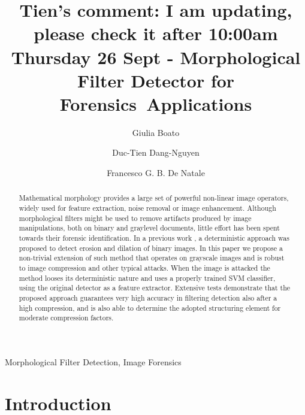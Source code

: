 \documentclass[review]{elsarticle}
\begin{document}
\begin{frontmatter}

\title{Tien's comment: I am updating, please check it after 10:00am Thursday 26 Sept - Morphological Filter Detector for Forensics~Applications}

\author{Giulia Boato}
\address{University of Trento, Italy}


\author{Duc-Tien Dang-Nguyen}
\address{University of Bergen, Norway}

\author{Francesco G. B. De Natale}
\address{University of Trento, Italy}

\begin{abstract}
Mathematical morphology provides a large set of powerful non-linear image operators, widely used for feature extraction, noise removal or image enhancement. Although morphological filters might be used to remove artifacts produced by image manipulations, both on binary and graylevel documents, little effort has been spent towards their forensic identification. In a previous work \cite{de2017detecting}, a deterministic approach was proposed to detect erosion and dilation of binary images. In this paper we propose a non-trivial extension of such method that operates on grayscale images and is robust to image compression and other typical attacks. When the image is attacked the method looses its deterministic nature and uses a properly trained SVM classifier, using the original detector as a feature extractor. Extensive tests demonstrate that the proposed approach guarantees very high accuracy in filtering detection also after a high compression, and is also able to determine the adopted structuring element for moderate compression factors.
\end{abstract}

\begin{keyword}
Morphological Filter Detection, Image Forensics 
\end{keyword}

\end{frontmatter}

\linenumbers

\section{Introduction}
\label{sec:intro}
\end{document}
